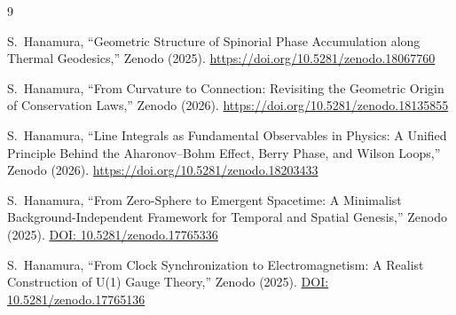 \documentclass[%
 reprint,
 amsmath,amssymb,
 aps,
 prb,
]{revtex4-2}
\numberwithin{equation}{section}
\begin{document}
\begin{thebibliography}{9}


S.~Hanamura, ``Geometric Structure of Spinorial Phase Accumulation along Thermal Geodesics,'' Zenodo (2025). \href{https://doi.org/10.5281/zenodo.18067760}{https://doi.org/10.5281/zenodo.18067760}

S.~Hanamura, ``From Curvature to Connection: Revisiting the Geometric Origin of Conservation Laws,'' Zenodo (2026). \href{https://doi.org/10.5281/zenodo.18135855}{https://doi.org/10.5281/zenodo.18135855}

S.~Hanamura, ``Line Integrals as Fundamental Observables in Physics: A Unified Principle Behind the Aharonov--Bohm Effect, Berry Phase, and Wilson Loops,'' Zenodo (2026). \href{https://doi.org/10.5281/zenodo.18203433}{https://doi.org/10.5281/zenodo.18203433}


S.~Hanamura,
``From Zero-Sphere to Emergent Spacetime: A Minimalist Background-Independent Framework for Temporal and Spatial Genesis,''
Zenodo (2025).
\href{https://doi.org/10.5281/zenodo.17765336}{DOI: 10.5281/zenodo.17765336}

S.~Hanamura,
``From Clock Synchronization to Electromagnetism: A Realist Construction of U(1) Gauge Theory,''
Zenodo (2025).
\href{https://doi.org/10.5281/zenodo.17765136}{DOI: 10.5281/zenodo.17765136}


\end{thebibliography}
\end{document}
